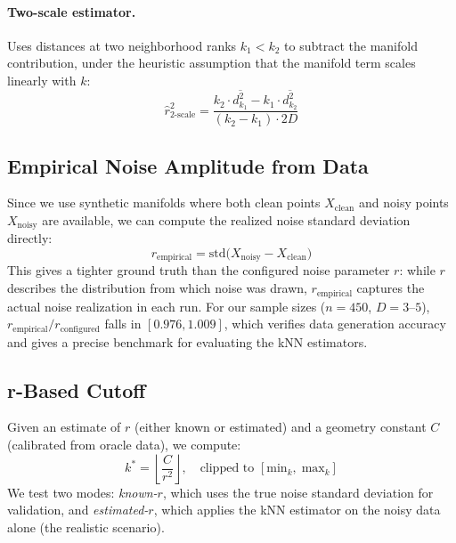 \documentclass{article}
\begin{document}
\paragraph{Two-scale estimator.} Uses distances at two neighborhood ranks $k_1 < k_2$ to subtract the manifold contribution, under the heuristic assumption that the manifold term scales linearly with $k$:
\begin{equation}
\hat{r}_{\text{2-scale}}^2 = \frac{k_2 \cdot \overline{d_{k_1}^2} - k_1 \cdot \overline{d_{k_2}^2}}{(k_2 - k_1) \cdot 2D}
\label{eq:twoscale_estimator}
\end{equation}

\subsection{Empirical Noise Amplitude from Data}
\label{sec:empirical_r_method}

Since we use synthetic manifolds where both clean points $X_{\text{clean}}$ and noisy points $X_{\text{noisy}}$ are available, we can compute the realized noise standard deviation directly:
\begin{equation}
r_{\text{empirical}} = \mathrm{std}\bigl(X_{\text{noisy}} - X_{\text{clean}}\bigr)
\label{eq:empirical_r}
\end{equation}
This gives a tighter ground truth than the configured noise parameter $r$: while $r$ describes the distribution from which noise was drawn, $r_{\text{empirical}}$ captures the actual noise realization in each run. For our sample sizes ($n = 450$, $D = 3$--$5$), $r_{\text{empirical}} / r_{\text{configured}}$ falls in $[0.976, 1.009]$, which verifies data generation accuracy and gives a precise benchmark for evaluating the kNN estimators.

\subsection{r-Based Cutoff}
\label{sec:r_based_cutoff}

Given an estimate of $r$ (either known or estimated) and a geometry constant $C$ (calibrated from oracle data), we compute:
\begin{equation}
k^* = \left\lfloor \frac{C}{r^2} \right\rfloor, \quad \text{clipped to } [\text{min}_k,\; \text{max}_k]
\label{eq:r_based}
\end{equation}
We test two modes: \emph{known-$r$}, which uses the true noise standard deviation for validation, and \emph{estimated-$r$}, which applies the kNN estimator on the noisy data alone (the realistic scenario).
\end{document}
